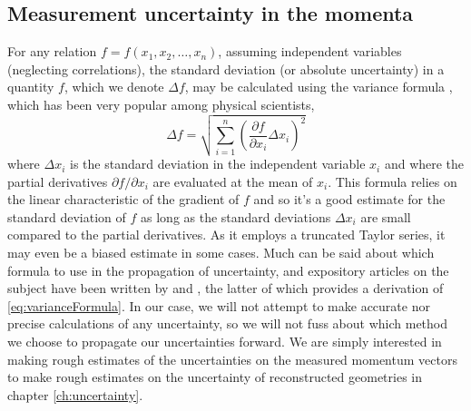 \subsection{Measurement uncertainty in the momenta}
For any relation $f = f(x_1, x_2, \dots, x_n)$, assuming independent variables (neglecting correlations), the standard deviation (or absolute uncertainty) in a quantity $f$, which we denote $\Delta f$, may be calculated using the variance formula \citep{Ku1966}, which has been very popular among physical scientists,
\begin{equation} \label{eq:varianceFormula}
\Delta f = \sqrt{\sum_{i=1}^{n} \left( \frac{\partial f}{\partial x_i} \Delta x_i \right)^2}
\end{equation}
where $\Delta x_i$ is the standard deviation in the independent variable $x_i$ and where the partial derivatives $\partial f/\partial x_i$ are evaluated at the mean of $x_i$. This formula relies on the linear characteristic of the gradient of $f$ and so it's a good estimate for the standard deviation of $f$ as long as the standard deviations $\Delta x_i$ are small compared to the partial derivatives. As it employs a truncated Taylor series, it may even be a biased estimate in some cases. Much can be said about which formula to use in the propagation of uncertainty, and expository articles on the subject have been written by \citet{Birge39} and \citet{Ku1966}, the latter of which provides a derivation of \eqref{eq:varianceFormula}. In our case, we will not attempt to make accurate nor precise calculations of any uncertainty, so we will not fuss about which method we choose to propagate our uncertainties forward. We are simply interested in making rough estimates of the uncertainties on the measured momentum vectors to make rough estimates on the uncertainty of reconstructed geometries in chapter \ref{ch:uncertainty}.

